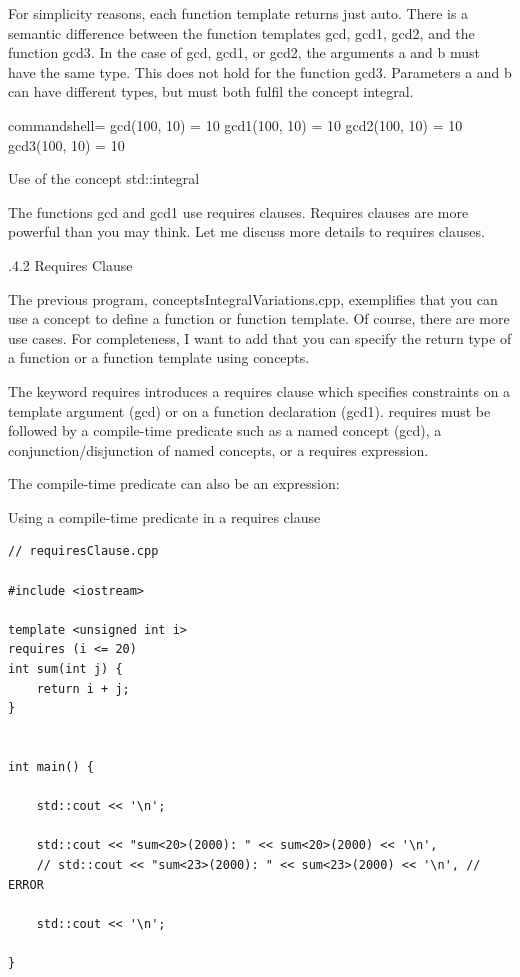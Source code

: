 For simplicity reasons, each function template returns just auto. There is a semantic difference between the function templates gcd, gcd1, gcd2, and the function gcd3. In the case of gcd, gcd1, or gcd2, the arguments a and b must have the same type. This does not hold for the function gcd3. Parameters a and b can have different types, but must both fulfil the concept integral.

\begin{tcblisting}{commandshell={}}
gcd(100, 10) = 10
gcd1(100, 10) = 10
gcd2(100, 10) = 10
gcd3(100, 10) = 10
\end{tcblisting}

\begin{center}
Use of the concept std::integral
\end{center}

The functions gcd and gcd1 use requires clauses. Requires clauses are more powerful than you may think. Let me discuss more details to requires clauses.

.4.2\hspace{0.2cm} Requires Clause

The previous program, conceptsIntegralVariations.cpp, exemplifies that you can use a concept to define a function or function template. Of course, there are more use cases. For completeness, I want to add that you can specify the return type of a function or a function template using concepts.

The keyword requires introduces a requires clause which specifies constraints on a template argument (gcd) or on a function declaration (gcd1). requires must be followed by a compile-time predicate such as a named concept (gcd), a conjunction/disjunction of named concepts, or a requires expression.

The compile-time predicate can also be an expression:

\noindent
Using a compile-time predicate in a requires clause
\begin{lstlisting}[style=styleCXX]
// requiresClause.cpp

#include <iostream>

template <unsigned int i>
requires (i <= 20)
int sum(int j) {
	return i + j;
}


int main() {

	std::cout << '\n';
	
	std::cout << "sum<20>(2000): " << sum<20>(2000) << '\n',
	// std::cout << "sum<23>(2000): " << sum<23>(2000) << '\n', // ERROR
	
	std::cout << '\n';

}
\end{lstlisting}

